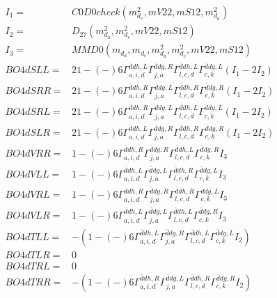 \documentclass[A4,landscape]{article}
\begin{document}
\begin{align} 
I_1 = & C0D0check(m^2_{d_{{c}}}, mV22, mS12, m^2_{d_{{a}}}) \\ 
I_2 = & D_{27}(m^2_{d_{{a}}}, m^2_{d_{{c}}}, mV22, mS12) \\ 
I_3 = & MMD0(m_{d_{{a}}}, m_{d_{{c}}}, m^2_{d_{{a}}}, m^2_{d_{{c}}}, mV22, mS12) \\ 
  BO4dSLL= & 2   1
-(-)
  6 \Gamma^{\bar{d}d h ,L}_{a, i, d} \Gamma^{\bar{d}d g ,R}_{j, a} \Gamma^{\bar{d}d h ,L}_{l, c, d} \Gamma^{\bar{d}d g ,L}_{c, k} (I_1 - 2 I_2) \\ 
  BO4dSRR= & 2   1
-(-)
  6 \Gamma^{\bar{d}d h ,R}_{a, i, d} \Gamma^{\bar{d}d g ,L}_{j, a} \Gamma^{\bar{d}d h ,R}_{l, c, d} \Gamma^{\bar{d}d g ,R}_{c, k} (I_1 - 2 I_2) \\ 
  BO4dSRL= & 2   1
-(-)
  6 \Gamma^{\bar{d}d h ,R}_{a, i, d} \Gamma^{\bar{d}d g ,L}_{j, a} \Gamma^{\bar{d}d h ,L}_{l, c, d} \Gamma^{\bar{d}d g ,L}_{c, k} (I_1 - 2 I_2) \\ 
  BO4dSLR= & 2   1
-(-)
  6 \Gamma^{\bar{d}d h ,L}_{a, i, d} \Gamma^{\bar{d}d g ,R}_{j, a} \Gamma^{\bar{d}d h ,R}_{l, c, d} \Gamma^{\bar{d}d g ,R}_{c, k} (I_1 - 2 I_2) \\ 
  BO4dVRR= &   1
-(-)
  6 \Gamma^{\bar{d}d h ,R}_{a, i, d} \Gamma^{\bar{d}d g ,R}_{j, a} \Gamma^{\bar{d}d h ,L}_{l, c, d} \Gamma^{\bar{d}d g ,R}_{c, k} I_3 \\ 
  BO4dVLL= &   1
-(-)
  6 \Gamma^{\bar{d}d h ,L}_{a, i, d} \Gamma^{\bar{d}d g ,L}_{j, a} \Gamma^{\bar{d}d h ,R}_{l, c, d} \Gamma^{\bar{d}d g ,L}_{c, k} I_3 \\ 
  BO4dVRL= &   1
-(-)
  6 \Gamma^{\bar{d}d h ,R}_{a, i, d} \Gamma^{\bar{d}d g ,R}_{j, a} \Gamma^{\bar{d}d h ,R}_{l, c, d} \Gamma^{\bar{d}d g ,L}_{c, k} I_3 \\ 
  BO4dVLR= &   1
-(-)
  6 \Gamma^{\bar{d}d h ,L}_{a, i, d} \Gamma^{\bar{d}d g ,L}_{j, a} \Gamma^{\bar{d}d h ,L}_{l, c, d} \Gamma^{\bar{d}d g ,R}_{c, k} I_3 \\ 
  BO4dTLL= & -(  1
-(-)
  6 \Gamma^{\bar{d}d h ,L}_{a, i, d} \Gamma^{\bar{d}d g ,R}_{j, a} \Gamma^{\bar{d}d h ,L}_{l, c, d} \Gamma^{\bar{d}d g ,L}_{c, k} I_2) \\ 
  BO4dTLR= & 0 \\ 
  BO4dTRL= & 0 \\ 
  BO4dTRR= & -(  1
-(-)
  6 \Gamma^{\bar{d}d h ,R}_{a, i, d} \Gamma^{\bar{d}d g ,L}_{j, a} \Gamma^{\bar{d}d h ,R}_{l, c, d} \Gamma^{\bar{d}d g ,R}_{c, k} I_2) \\ 
\end{align} 
\end{document}
